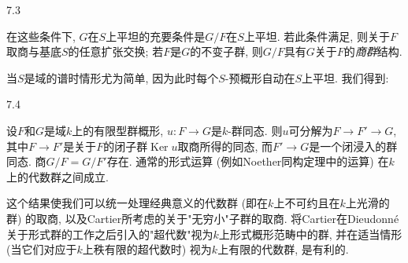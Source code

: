 \begin{corollary}{7.3}\label{fga3.iii-7-corollary-7.3}\skipsinglepar
\par{}在这些条件下, \(G\)在\(S\)上平坦的充要条件是\(G/F\)在\(S\)上平坦. 若此条件满足, 则关于\(F\)取商与基底\(S\)的任意扩张交换; 若\(F\)是\(G\)的不变子群, 则\(G/F\)具有\(G\)关于\(F\)的\emph{商群}结构.
\end{corollary}
\par{}当\(S\)是域的谱时情形尤为简单, 因为此时每个\(S\)-预概形自动在\(S\)上平坦. 我们得到:
\begin{corollary}{7.4}\label{fga3.iii-7-corollary-7.4}\skipsinglepar
\par{}设\(F\)和\(G\)是域\(k\)上的有限型群概形, \(u\colon  F\to  G\)是\(k\)-群同态. 则\(u\)可分解为\(F\to  F'\to  G\), 其中\(F\to  F'\)是关于\(F\)的闭子群\(\operatorname {Ker} u\)取商所得的同态, 而\(F'\to  G\)是一个闭浸入的群同态. 商\(G/F=G/F'\)存在. 通常的形式运算 (例如Noether同构定理中的运算) 在\(k\)上的代数群之间成立.
\end{corollary}
\par{}这个结果使我们可以统一处理经典意义的代数群 (即在\(k\)上不可约且在\(k\)上光滑的群) 的取商, 以及Cartier所考虑的关于"无穷小"子群的取商. 将Cartier在Dieudonné关于形式群的工作之后引入的"超代数"视为\(k\)上形式概形范畴中的群, 并在适当情形 (当它们对应于\(k\)上秩有限的超代数时) 视为\(k\)上有限的代数群, 是有利的.
